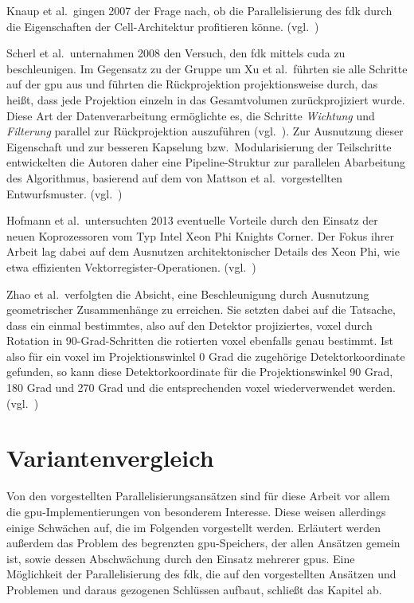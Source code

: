 Knaup et al.\ gingen 2007 der Frage nach, ob die Parallelisierung des \gls{fdk} durch die Eigenschaften der
Cell-Architektur profitieren könne. (vgl.~\cite{knaupsteck})

Scherl et al.\ unternahmen 2008 den Versuch, den \gls{fdk} mittels \gls{cuda} zu beschleunigen. Im Gegensatz zu der
Gruppe um Xu et al.\ führten sie alle Schritte auf der \gls{gpu} aus und führten die Rückprojektion projektionsweise
durch, das heißt, dass jede Projektion einzeln in das Gesamtvolumen zurückprojiziert wurde. Diese Art der
Datenverarbeitung ermöglichte es, die Schritte \textit{Wichtung} und \textit{Filterung} parallel zur Rückprojektion
auszuführen (vgl.~\cite{scherlkeck}). Zur Ausnutzung dieser Eigenschaft und zur besseren Kapselung bzw.\ Modularisierung
der Teilschritte entwickelten die Autoren daher eine Pipeline-Struktur zur parallelen Abarbeitung des Algorithmus,
basierend auf dem von Mattson et al.\ vorgestellten Entwurfsmuster. (vgl.~\cite{mattsan})

Hofmann et al.\ untersuchten 2013 eventuelle Vorteile durch den Einsatz der neuen Koprozessoren vom Typ Intel Xeon Phi
{\glq}Knights Corner{\grq}. Der Fokus ihrer Arbeit lag dabei auf dem Ausnutzen architektonischer Details des Xeon Phi,
wie etwa effizienten Vektorregister-Operationen. (vgl.~\cite{hoftrei})

Zhao et al.\ verfolgten die Absicht, eine Beschleunigung durch Ausnutzung geometrischer Zusammenhänge zu
erreichen. Sie setzten dabei auf die Tatsache, dass ein einmal bestimmtes, also auf den Detektor projiziertes,
\gls{voxel} durch Rotation in 90-Grad-Schritten die rotierten \gls{voxel} ebenfalls genau bestimmt. Ist also für ein
\gls{voxel} im Projektionswinkel 0 Grad die zugehörige Detektorkoordinate gefunden, so kann diese Detektorkoordinate für
die Projektionswinkel 90 Grad, 180 Grad und 270 Grad und die entsprechenden \gls{voxel} wiederverwendet werden.
(vgl.~\cite{zhao})

\section{Variantenvergleich}

Von den vorgestellten Parallelisierungsansätzen sind für diese Arbeit vor allem die \gls{gpu}-Implementierungen von
besonderem Interesse. Diese weisen allerdings einige Schwächen auf, die im Folgenden vorgestellt werden. Erläutert
werden außerdem das Problem des begrenzten \gls{gpu}-Speichers, der allen Ansätzen gemein ist, sowie dessen Abschwächung
durch den Einsatz mehrerer \gls{gpu}s. Eine Möglichkeit der Parallelisierung des \gls{fdk}, die auf den vorgestellten
Ansätzen und Problemen und daraus gezogenen Schlüssen aufbaut, schließt das Kapitel ab.

